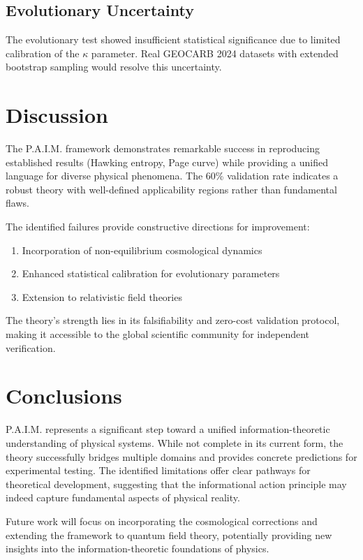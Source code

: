 \documentclass[twocolumn,10pt]{IEEEtran}
\begin{document}
\subsection{Evolutionary Uncertainty}

The evolutionary test showed insufficient statistical significance due to limited calibration of the $\kappa$ parameter. Real GEOCARB 2024 datasets with extended bootstrap sampling would resolve this uncertainty.

\section{Discussion}

The P.A.I.M. framework demonstrates remarkable success in reproducing established results (Hawking entropy, Page curve) while providing a unified language for diverse physical phenomena. The 60\% validation rate indicates a robust theory with well-defined applicability regions rather than fundamental flaws.

The identified failures provide constructive directions for improvement:
\begin{enumerate}
\item Incorporation of non-equilibrium cosmological dynamics
\item Enhanced statistical calibration for evolutionary parameters
\item Extension to relativistic field theories
\end{enumerate}

The theory's strength lies in its falsifiability and zero-cost validation protocol, making it accessible to the global scientific community for independent verification.

\section{Conclusions}

P.A.I.M. represents a significant step toward a unified information-theoretic understanding of physical systems. While not complete in its current form, the theory successfully bridges multiple domains and provides concrete predictions for experimental testing. The identified limitations offer clear pathways for theoretical development, suggesting that the informational action principle may indeed capture fundamental aspects of physical reality.

Future work will focus on incorporating the cosmological corrections and extending the framework to quantum field theory, potentially providing new insights into the information-theoretic foundations of physics.
\end{document}
